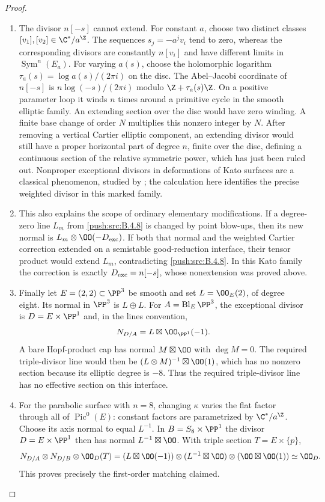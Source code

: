 \begin{proof}
\begin{enumerate}[label=\arabic*.,leftmargin=*]
\item The divisor $n[-s]$ cannot extend. For constant $a$, choose two
distinct classes $[v_1],[v_2]\in\C^*/a^\Z$.
The sequences $s_j=-a^jv_i$ tend to zero, whereas the corresponding
divisors are constantly $n[v_i]$ and have different limits in
$\operatorname{Sym}^n(E_a)$.
For varying $a(s)$, choose the holomorphic logarithm
$\tau_a(s)=\log a(s)/(2\pi i)$ on the disc.
The Abel--Jacobi coordinate of $n[-s]$ is
$n\log(-s)/(2\pi i)$ modulo $\Z+\tau_a(s)\Z$.
On a positive parameter loop it winds $n$ times around a primitive
cycle in the smooth elliptic family. An extending section over the
disc would have zero winding. A finite base change of order $N$
multiplies this nonzero integer by $N$.
After removing a vertical Cartier elliptic component, an extending
divisor would still have a proper horizontal part of
degree $n$, finite over the disc, defining a continuous
section of the relative symmetric power, which has just been ruled
out. Nonproper exceptional divisors in deformations of Kato surfaces
are a classical phenomenon, studied by
\citet[arXiv version~2, Section~1.2, PDF pp.~3--5]{DlousskyTeleman2012AB}; the calculation here
identifies the precise weighted divisor in this marked family.

\item This also explains the scope of ordinary elementary modifications.
If a degree-zero line $L_m$ from \ref{push:src:B.4.8} is changed by point blow-ups,
then its new normal is $L_m\otimes\OO(-D_{\rm exc})$.
If both that normal and the weighted Cartier correction extended on
a semistable good-reduction interface, their tensor product would
extend $L_m$, contradicting \ref{push:src:B.4.8}. In this Kato family the correction is exactly $D_{\rm exc}=n[-s]$,
whose nonextension was proved above.

\item Finally let $E=(2,2)\subset\PP^3$ be smooth and set
$L=\OO_E(2)$, of degree eight. Its normal in $\PP^3$ is
$L\oplus L$. For $A=\operatorname{Bl}_E\PP^3$, the exceptional
divisor is $D=E\times\PP^1$ and, in the lines convention,
\[
 N_{D/A}=L\boxtimes\OO_{\PP^1}(-1).
\]
A bare Hopf-product cap has normal $M\boxtimes\OO$ with
$\deg M=0$. The required triple-divisor line would then be
$(L\otimes M)^{-1}\boxtimes\OO(1)$, which has no nonzero section
because its elliptic degree is $-8$. Thus the required triple-divisor line has no effective section
on this interface.

\item For the parabolic surface with $n=8$, changing $\kappa$ varies the
flat factor through all of $\operatorname{Pic}^0(E)$:
constant factors are parametrized by $\C^*/a^\Z$.
Choose its axis normal to equal $L^{-1}$.
In $B=S_8\times\PP^1$ the divisor $D=E\times\PP^1$ then has normal
$L^{-1}\boxtimes\OO$. With triple section $T=E\times\{p\}$,
\[
 N_{D/A}\otimes N_{D/B}\otimes\OO_D(T)
   =(L\boxtimes\OO(-1))\otimes
     (L^{-1}\boxtimes\OO)\otimes(\OO\boxtimes\OO(1))
   \simeq\OO_D.
\]
This proves precisely the first-order matching claimed.
\end{enumerate}
\end{proof}
